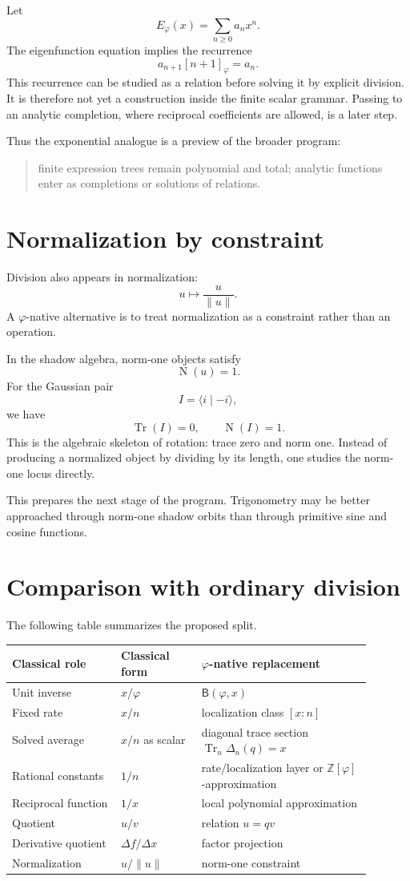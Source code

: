 \documentclass[11pt]{article}
\newcommand{\B}{\mathsf{B}}
\newcommand{\Tr}{\operatorname{Tr}}
\newcommand{\Nm}{\operatorname{N}}
\newcommand{\ph}{\varphi}
\newcommand{\Z}{\mathbb{Z}}
\begin{document}
Let
\[
    E_\ph(x)=\sum_{n\ge0}a_nx^n.
\]
The eigenfunction equation implies the recurrence
\[
    a_{n+1}[n+1]_\ph=a_n.
\]
This recurrence can be studied as a relation before solving it by explicit division.  It is therefore not yet a construction inside the finite scalar grammar.  Passing to an analytic completion, where reciprocal coefficients are allowed, is a later step.

Thus the exponential analogue is a preview of the broader program:
\begin{quote}
finite expression trees remain polynomial and total; analytic functions enter as completions or solutions of relations.
\end{quote}

\section{Normalization by constraint}

Division also appears in normalization:
\[
    u\mapsto \frac{u}{\|u\|}.
\]
A $\ph$-native alternative is to treat normalization as a constraint rather than an operation.

In the shadow algebra, norm-one objects satisfy
\[
    \Nm(u)=1.
\]
For the Gaussian pair
\[
    I=\langle i\mid -i\rangle,
\]
we have
\[
    \Tr(I)=0,
    \qquad
    \Nm(I)=1.
\]
This is the algebraic skeleton of rotation: trace zero and norm one.  Instead of producing a normalized object by dividing by its length, one studies the norm-one locus directly.

This prepares the next stage of the program.  Trigonometry may be better approached through norm-one shadow orbits than through primitive sine and cosine functions.

\section{Comparison with ordinary division}

The following table summarizes the proposed split.

\begin{center}
\begin{tabular}{p{0.27\linewidth}p{0.20\linewidth}p{0.42\linewidth}}
\toprule
Classical role & Classical form & $\ph$-native replacement \\
\midrule
Unit inverse & $x/\ph$ & $\B(\ph,x)$ \\
Fixed rate & $x/n$ & localization class $[x:n]$ \\
Solved average & $x/n$ as scalar & diagonal trace section $\Tr_n\Delta_n(q)=x$ \\
Rational constants & $1/n$ & rate/localization layer or $\Z[\ph]$-approximation \\
Reciprocal function & $1/x$ & local polynomial approximation \\
Quotient & $u/v$ & relation $u=qv$ \\
Derivative quotient & $\Delta f/\Delta x$ & factor projection \\
Normalization & $u/\|u\|$ & norm-one constraint \\
\bottomrule
\end{tabular}
\end{center}
\end{document}
